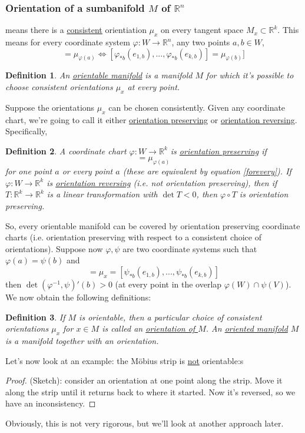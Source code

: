 \documentclass{article}
\newtheorem{definition}{Definition}
\newcommand{\reals}[0]{\mathbb{R}}
\begin{document}
\subsubsection{Orientation of a sumbanifold \(M\) of \(\reals^n\)}
means there is a \underline{consistent} orientiation \(\mu_x\) on every tangent space \(M_x \subset \reals^k\). This means for every coordinate system \(\varphi: W \to \reals^n\), any two points \(a, b \in W\),
\begin{equation}
  [\varphi_{*a}(e_{1,a}),...,\varphi_{*a}(e_{k,a})] = \mu_{\varphi(a)} \iff [\varphi_{*b}(e_{1,b}),...,\varphi_{*b}(e_{k,b})] = \mu_{\varphi(b)}]
  \label{forevery}
\end{equation}
\begin{definition}
  An \underline{orientable manifold} is a manifold \(M\) for which it's possible to choose consistent orientations \(\mu_x\) at every point.
\end{definition}
Suppose the orientations \(\mu_x\) can be chosen consistently. Given any coordinate chart, we're going to call it either \underline{orientation preserving} or \underline{orientation reversing}. Specifically,
\begin{definition}
  A coordinate chart \(\varphi: W \to \reals^k\) is \underline{orientation preserving} if
  \begin{equation}
    [\varphi_{*a}(e_{1,a}),...,\varphi_{*a}(e_{k, a})] = \mu_{\varphi(a)}
  \end{equation}
  for one point \(a\) or every point \(a\) (these are equivalent by equation \ref{forevery}).
  If \(\varphi: W \to \reals^k\) is \underline{orientation reversing} (i.e. not orientation preserving), then if \(T: \reals^k \to \reals^k\) is a linear transformation with \(\det T < 0\), then \(\varphi \circ T\) is orientation preserving.
\end{definition}
So, every orientable manifold can be covered by orientation preserving coordinate charts (i.e. orientation preserving with respect to a consistent choice of orientations). Suppose now \(\varphi, \psi\) are two coordinate systems such that \(\varphi(a) = \psi(b)\) and
\begin{equation}
  [\varphi_{*a}(e_{1,a}),...,\varphi_{*b}(e_{k, a})] = \mu_x = [\psi_{*b}(e_{1,b}),...,\psi_{*b}(e_{k,b})]
\end{equation}
then \(\det(\varphi^{-1}, \psi)'(b) > 0\) (at every point in the overlap \(\varphi(W) \cap \psi(V)\)). We now obtain the following definitions:
\begin{definition}
If \(M\) is orientable, then a particular choice of consistent orientations \(\mu_x\) for \(x \in M\) is called an \underline{orientation of \(M\)}. An \underline{oriented manifold} \(M\) is a manifold together with an orientation.
\end{definition}
Let's now look at an example: the Möbius strip is \underline{not} orientable:s
\begin{proof} (Sketch): consider an orientation at one point along the strip. Move it along the strip until it returns back to where it started. Now it's reversed, so we have an inconsistency.
\end{proof}
Obviously, this is not very rigorous, but we'll look at another approach later.
\end{document}
